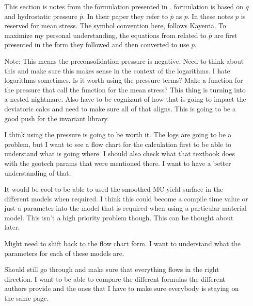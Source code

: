 \documentclass[a4paper,12pt]{article}
\begin{document}
This section is notes from the formulation presented in \cite{silbermannImplementationModifiedCam}. \cite{silbermannImplementationModifiedCam} formulation is based on $q$ and hydrostatic pressure $\bar{p}$. In their paper they refer to $\bar{p}$ as $p$. In these notes $p$ is reserved for mean stress. The symbol convention here, follows Kayenta. To maximize my personal understanding, the equations from \cite{silbermannImplementationModifiedCam} related to $\bar{p}$ are first presented in the form they followed and then converted to use $p$.

Note: This means the preconsolidation pressure is negative. Need to think about this and make sure this makes sense in the context of the logarithms. I hate logarithms sometimes. Is it worth using the pressure terms? Make a function for the pressure that call the function for the mean stress? This thing is turning into a nested nightmare. Also have to be cognizant of how that is going to impact the deviatoric calcs and need to make sure all of that aligns. This is going to be a good push for the invariant library.

I think using the pressure is going to be worth it. The logs are going to be a problem, but I want to see a flow chart for the calculation first to be able to understand what is going where. I should also check what that textbook does with the geotech params that were mentioned there. I want to have a better understanding of that. 

It would be cool to be able to used the smoothed MC yield surface in the different models when required. I think this could become a compile time value or just a parameter into the model that is required when using a particular material model. This isn't a high priority problem though. This can be thought about later.

Might need to shift back to the flow chart form. I want to understand what the parameters for each of these models are.

Should still go through and make sure that everything flows in the right direction. I want to be able to compare the different formulas the different authors provide and the ones that I have to make sure everybody is staying on the same page.

    
\end{document}
